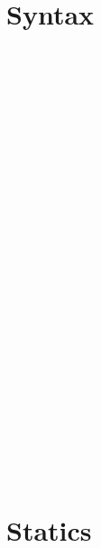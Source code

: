 \section{\lang Syntax}
\label{sec:full-syntax}

\begin{figure}[H]
  \small
  \oxnamegrammar

  \begin{bnf}
    \oxpathgrammar \\[0em]
    \oxplacegrammar \\[0em]
    \oxplaceexprgrammar \\[0em]
    \oxplaceexprctxgrammar \\[0.75em]

    \oxprovgrammar \\[0em]
    \oxmutagrammar \\[0em]
    \oxrewritemodegrammar \\[0em]
    \oxloangrammar \\[0.75em]
    
    \oxkindgrammar \\[0em]
    \oxbasetypegrammar \\[0em]
    \oxsitypegrammar \\[0em]
    \oxxitypegrammar \\[0em]
    \oxsdtypegrammar \\[0em]
    \oxsxtypegrammar \\[0em]
    \oxtypegrammar \\[0.75em]

    \oxprimitivegrammar \\[0em]
    \oxexpressiongrammar \\[0em]
    \oxenvgrammar \\[0.75em]

    \oxglobalctxgrammar \\[0em]
    \oxglobalentrygrammar \\[0.75em]
    \oxtvarctxgrammar \\[0em]
    \oxframegrammar\\[0em]
    \oxvarctxgrammar \\[0em]
    \oxkontctxgrammar \\[0.75em]
  \end{bnf}
\end{figure}

\section{Statics}
\label{sec:full-statics}

